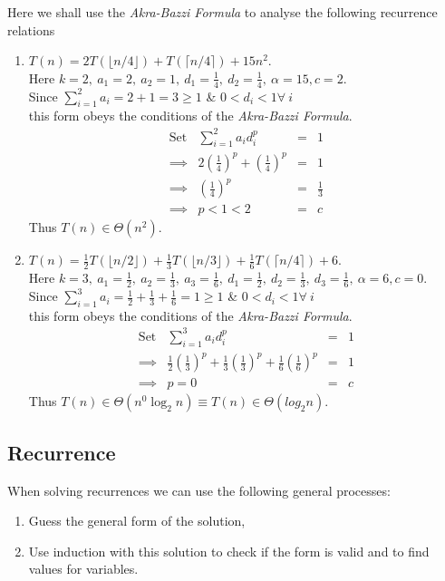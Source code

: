 \documentclass[11pt,a4paper]{article}
\begin{document}
Here we shall use the \textit{Akra-Bazzi Formula} to analyse the following recurrence relations
\begin{enumerate}[label=\roman*)]
	\item $T(n)=2T(\lfloor n/4\rfloor)+T(\lceil n/4\rceil)+15n^2$.\\
	Here $k=2,\ a_1=2,\ a_2=1,\ d_1=\frac{1}{4},\ d_2=\frac{1}{4},\ \alpha=15, c=2$.\\
	Since $\sum_{i=1}^2a_i=2+1=3\geq 1$ \& $0<d_i<1\forall\ i$\\
	this form obeys the conditions of the \textit{Akra-Bazzi Formula}.\\
	\[\begin{array}{rrcl}
	\mathrm{Set}&\sum_{i=1}^2a_id_i^p&=&1\\
	\implies&2\left(\frac{1}{4}\right)^p+\left(\frac{1}{4}\right)^p&=&1\\
	\implies&\left(\frac{1}{4}\right)^p&=&\frac{1}{3}\\
	\implies&p<1<2&=&c
	\end{array}\]
	Thus $T(n)\in \Theta(n^2)$.
	
	\item $T(n)=\frac{1}{2}T(\lfloor n/2\rfloor)+\frac{1}{3}T(\lfloor n/3\rfloor)+\frac{1}{6}T(\lceil n/4\rceil)+6$.\\
	Here $k=3,\ a_1=\frac{1}{2},\ a_2=\frac{1}{3},\ a_3=\frac{1}{6},\ d_1=\frac{1}{2},\ d_2=\frac{1}{3},\ d_3=\frac{1}{6},\ \alpha=6, c=0$.\\
	Since $\sum_{i=1}^3a_i=\frac{1}{2}+\frac{1}{3}+\frac{1}{6}=1\geq 1$ \& $0<d_i<1\forall\ i$\\
	this form obeys the conditions of the \textit{Akra-Bazzi Formula}.\\
	\[\begin{array}{rrcl}
	\mathrm{Set}&\sum_{i=1}^3a_id_i^p&=&1\\
	\implies&\frac{1}{2}\left(\frac{1}{3}\right)^p+\frac{1}{3}\left(\frac{1}{3}\right)^p+\frac{1}{6}\left(\frac{1}{6}\right)^p&=&1\\
	\implies&p=0&=&c
	\end{array}\]
	Thus $T(n)\in \Theta(n^0\log_2n)\equiv T(n)\in\Theta(log_2n)$.
\end{enumerate}

\subsection{Recurrence}

When solving recurrences we can use the following general processes:
\begin{enumerate}[label=\roman*)]
  \item Guess the general form of the solution,
  \item Use induction with this solution to check if the form is valid and to find values for variables.
\end{enumerate}
\end{document}
